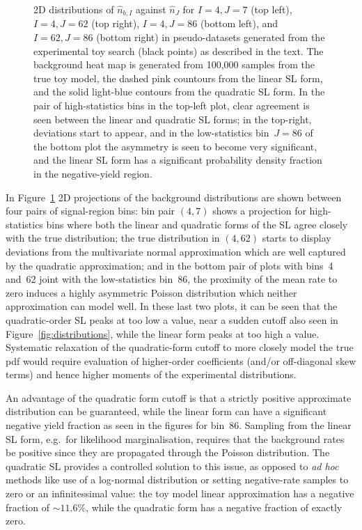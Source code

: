\documentclass[11pt]{article}
\begin{document}
\begin{figure}
  \caption{2D distributions of $\hat{n}_{b,I}$ against $\hat{n}_{J}$ for
    $I=4,J=7$ (top left), $I=4,J=62$ (top right), $I=4,J=86$ (bottom left), and
    $I=62,J=86$ (bottom right) in pseudo-datasets generated from the
    experimental toy search (black points) as described in the text. The
    background heat map is generated from 100,000 samples from the true toy
    model, the dashed pink countours from the linear SL form, and the solid
    light-blue contours from the quadratic SL form. In the pair of
    high-statistics bins in the top-left plot, clear agreement is seen between
    the linear and quadratic SL forms; in the top-right, deviations start to
    appear, and in the low-statistics bin~$J=86$ of the bottom plot the
    asymmetry is seen to become very significant, and the linear SL form has a
    significant probability density fraction in the negative-yield region.}
  \label{fig:distributions2d}
\end{figure}

In Figure~\ref{fig:distributions2d} 2D projections of the background
distributions are shown between four pairs of signal-region bins: bin pair
$(4,7)$ shows a projection for high-statistics bins where both the linear and
quadratic forms of the SL agree closely with the true distribution; the true
distribution in $(4,62)$ starts to display deviations from the multivariate
normal approximation which are well captured by the quadratic approximation; and
in the bottom pair of plots with bins~4 and~62 joint with the low-statistics
bin~86, the proximity of the mean rate to zero induces a highly asymmetric
Poisson distribution which neither approximation can model well. In these last
two plots, it can be seen that the quadratic-order SL peaks at too low a value,
near a sudden cutoff also seen in Figure~\ref{fig:distributions}, while the
linear form peaks at too high a value.  Systematic relaxation of the
quadratic-form cutoff to more closely model the true pdf would require
evaluation of higher-order coefficients (and/or off-diagonal skew terms) and
hence higher moments of the experimental distributions.

An advantage of the quadratic form cutoff is that a strictly positive
approximate distribution can be guaranteed, while the linear form can have a
significant negative yield fraction as seen in the figures for bin~86. Sampling
from the linear SL form, e.g.~for likelihood marginalisation, requires that the
background rates be positive since they are propagated through the Poisson
distribution. The quadratic SL provides a controlled solution to this issue,
as opposed to \emph{ad hoc} methods like use of a log-normal distribution or
setting negative-rate samples to zero or an infinitessimal value: the toy model
linear approximation has a negative fraction of $\sim\!11.6\%$, while the
quadratic form has a negative fraction of exactly zero.
\end{document}
